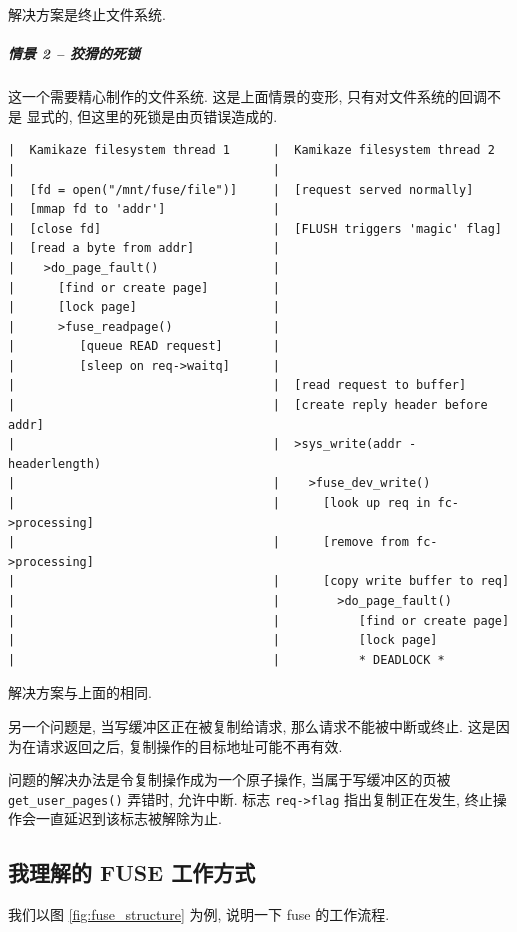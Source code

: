 \documentclass[nofonts, titlepage]{ctexart}
\begin{document}
解决方案是终止文件系统.

\subparagraph{情景 2 --
狡猾的死锁}\label{ux60c5ux666f-2-ux72e1ux733eux7684ux6b7bux9501}

这一个需要精心制作的文件系统. 这是上面情景的变形,
只有对文件系统的回调不是 显式的, 但这里的死锁是由页错误造成的.

\begin{verbatim}
|  Kamikaze filesystem thread 1      |  Kamikaze filesystem thread 2
|                                    |
|  [fd = open("/mnt/fuse/file")]     |  [request served normally]
|  [mmap fd to 'addr']               |
|  [close fd]                        |  [FLUSH triggers 'magic' flag]
|  [read a byte from addr]           |
|    >do_page_fault()                |
|      [find or create page]         |
|      [lock page]                   |
|      >fuse_readpage()              |
|         [queue READ request]       |
|         [sleep on req->waitq]      |
|                                    |  [read request to buffer]
|                                    |  [create reply header before addr]
|                                    |  >sys_write(addr - headerlength)
|                                    |    >fuse_dev_write()
|                                    |      [look up req in fc->processing]
|                                    |      [remove from fc->processing]
|                                    |      [copy write buffer to req]
|                                    |        >do_page_fault()
|                                    |           [find or create page]
|                                    |           [lock page]
|                                    |           * DEADLOCK *
\end{verbatim}

解决方案与上面的相同.

另一个问题是, 当写缓冲区正在被复制给请求, 那么请求不能被中断或终止.
这是因 为在请求返回之后, 复制操作的目标地址可能不再有效.

问题的解决办法是令复制操作成为一个原子操作, 当属于写缓冲区的页被
\texttt{get\_user\_pages()} 弄错时, 允许中断. 标志
\texttt{req-\textgreater{}flag} 指出复制正在发生,
终止操作会一直延迟到该标志被解除为止.

\subsection{我理解的 FUSE
工作方式}\label{ux6211ux7406ux89e3ux7684-fuse-ux5de5ux4f5cux65b9ux5f0f}

我们以图 \ref{fig:fuse_structure} 为例, 说明一下 fuse 的工作流程.
\end{document}
